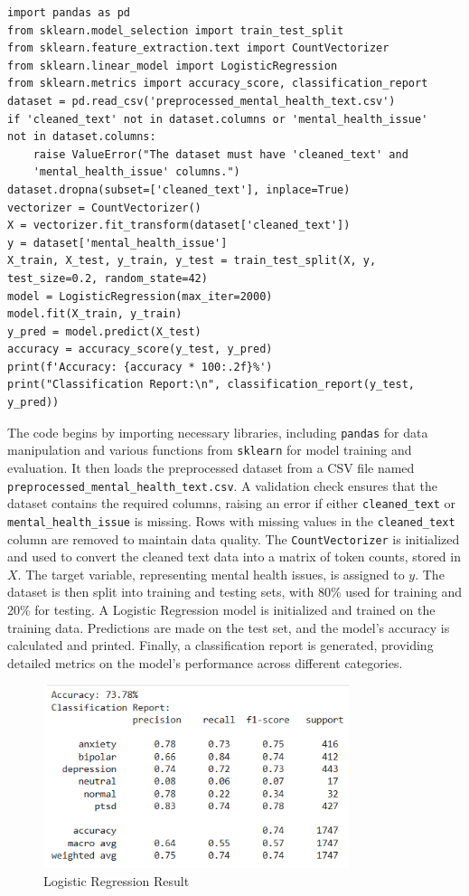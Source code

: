 \begin{verbatim}
import pandas as pd
from sklearn.model_selection import train_test_split
from sklearn.feature_extraction.text import CountVectorizer
from sklearn.linear_model import LogisticRegression
from sklearn.metrics import accuracy_score, classification_report
dataset = pd.read_csv('preprocessed_mental_health_text.csv')
if 'cleaned_text' not in dataset.columns or 'mental_health_issue' 
not in dataset.columns:
    raise ValueError("The dataset must have 'cleaned_text' and 
    'mental_health_issue' columns.")
dataset.dropna(subset=['cleaned_text'], inplace=True)
vectorizer = CountVectorizer()
X = vectorizer.fit_transform(dataset['cleaned_text'])
y = dataset['mental_health_issue']
X_train, X_test, y_train, y_test = train_test_split(X, y, 
test_size=0.2, random_state=42)
model = LogisticRegression(max_iter=2000)
model.fit(X_train, y_train)
y_pred = model.predict(X_test)
accuracy = accuracy_score(y_test, y_pred)
print(f'Accuracy: {accuracy * 100:.2f}%')
print("Classification Report:\n", classification_report(y_test, 
y_pred))
\end{verbatim}

\noindent
The code begins by importing necessary libraries, including \texttt{pandas} for data manipulation and various functions from \texttt{sklearn} for model training and evaluation. It then loads the preprocessed dataset from a CSV file named \texttt{preprocessed\_mental\_health\_text.csv}. A validation check ensures that the dataset contains the required columns, raising an error if either \texttt{cleaned\_text} or \texttt{mental\_health\_issue} is missing. Rows with missing values in the \texttt{cleaned\_text} column are removed to maintain data quality. The \texttt{CountVectorizer} is initialized and used to convert the cleaned text data into a matrix of token counts, stored in \(X\). The target variable, representing mental health issues, is assigned to \(y\). The dataset is then split into training and testing sets, with 80\% used for training and 20\% for testing. A Logistic Regression model is initialized and trained on the training data. Predictions are made on the test set, and the model's accuracy is calculated and printed. Finally, a classification report is generated, providing detailed metrics on the model’s performance across different categories.

\begin{figure}[h!]  
    \centering
    \includegraphics[width=0.8\textwidth]{Images/Output Logistic Regression.png}  
    \caption{Logistic Regression Result}
    \label{Logistic Regression Result}  %
\end{figure}

